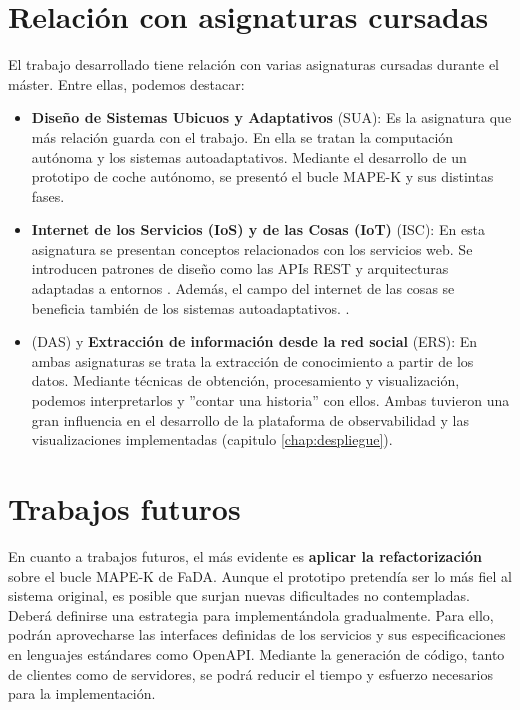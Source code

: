 \section{Relación con asignaturas cursadas}

El trabajo desarrollado tiene relación con varias asignaturas cursadas durante el máster. Entre ellas, podemos destacar:

\begin{itemize}
  \item \textbf{Diseño de Sistemas Ubicuos y Adaptativos} (SUA): Es la asignatura que más relación guarda con el trabajo. En ella se tratan la computación autónoma y los sistemas autoadaptativos. Mediante el desarrollo de un prototipo de coche autónomo, se presentó el bucle MAPE-K y sus distintas fases.

  \item \textbf{Internet de los Servicios (IoS) y de las Cosas (IoT)} (ISC): En esta asignatura se presentan conceptos relacionados con los servicios web. Se introducen patrones de diseño como las APIs REST y arquitecturas adaptadas a entornos . Además, el campo del internet de las cosas se beneficia también de los sistemas autoadaptativos. \cite{savaglioAgentbasedInternetThings2020}.

  \item \textbf{} (DAS) y \textbf{Extracción de información desde la red social} (ERS): En ambas asignaturas se trata la extracción de conocimiento a partir de los datos. Mediante técnicas de obtención, procesamiento y visualización, podemos interpretarlos y ''contar una historia'' con ellos. Ambas tuvieron una gran influencia en el desarrollo de la plataforma de observabilidad y las visualizaciones implementadas (capitulo \ref{chap:despliegue}).

\end{itemize}

\section{Trabajos futuros}

En cuanto a trabajos futuros, el más evidente es \textbf{aplicar la refactorización} sobre el bucle MAPE-K  de FaDA. Aunque el prototipo pretendía ser lo más fiel al sistema original, es posible que surjan nuevas dificultades no contempladas. Deberá definirse una estrategia para implementándola gradualmente. Para ello, podrán aprovecharse las interfaces definidas de los servicios y sus especificaciones en lenguajes estándares como OpenAPI. Mediante la generación de código, tanto de clientes como de servidores, se podrá reducir el tiempo y esfuerzo necesarios para la implementación.

